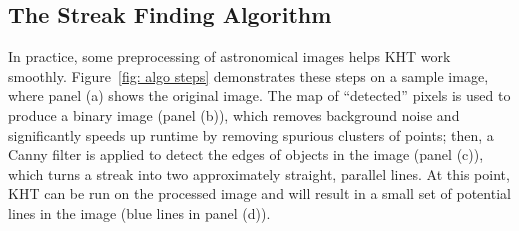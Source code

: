 \documentclass[DM,authoryear,toc]{lsstdoc}
\begin{document}
\subsection{The Streak Finding Algorithm}
\label{sec: algorithm}
In practice, some preprocessing of astronomical images helps KHT work smoothly. Figure~\ref{fig: algo steps} demonstrates these steps on a sample image, where panel (a) shows the original image. The map of ``detected'' pixels is used to produce a binary image (panel (b)), which removes background noise and significantly speeds up runtime by removing spurious clusters of points; then, a Canny filter is applied to detect the edges of objects in the image (panel (c)), which turns a streak into two approximately straight, parallel lines. At this point, KHT can be run on the processed image and will result in a small set of potential lines in the image (blue lines in panel (d)). 
\end{document}
